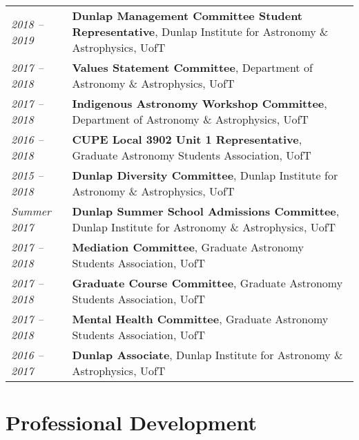 \documentclass[10pt]{res} %
\begin{document}
\begin{resume}
\begin{table}[h]
\begin{tabularx}{\textwidth}{lX}
\textit{2018 -- 2019} & \textbf{Dunlap Management Committee Student Representative}, Dunlap Institute for Astronomy \& Astrophysics, UofT \\
\textit{2017 -- 2018} & \textbf{Values Statement Committee}, Department of Astronomy \& Astrophysics, UofT \\
\textit{2017 -- 2018} & \textbf{Indigenous Astronomy  Workshop Committee}, Department of Astronomy \& Astrophysics, UofT \\
\textit{2016 --  2018} & \textbf{CUPE Local 3902 Unit 1 Representative}, Graduate Astronomy Students Association, UofT \\
\textit{2015 --  2018} & \textbf{Dunlap Diversity Committee}, Dunlap Institute for Astronomy \& Astrophysics, UofT \\
\textit{Summer 2017} & \textbf{Dunlap Summer School Admissions Committee}, Dunlap Institute for Astronomy \& Astrophysics, UofT \\
\textit{2017 -- 2018} & \textbf{Mediation Committee}, Graduate Astronomy Students Association, UofT \\
\textit{2017 -- 2018} & \textbf{Graduate Course Committee}, Graduate Astronomy Students Association, UofT \\
\textit{2017 -- 2018} & \textbf{Mental Health Committee}, Graduate Astronomy Students Association, UofT \\
\textit{2016 --  2017} & \textbf{Dunlap Associate}, Dunlap Institute for Astronomy \& Astrophysics, UofT
\end{tabularx}
\end{table}


\section{\Large Professional Development}
\vspace{-5pt} %
\noindent\makebox[\linewidth]{\rule{\textwidth}{0.4pt}}
\vspace{-20pt} %


\end{resume}
\end{document}
